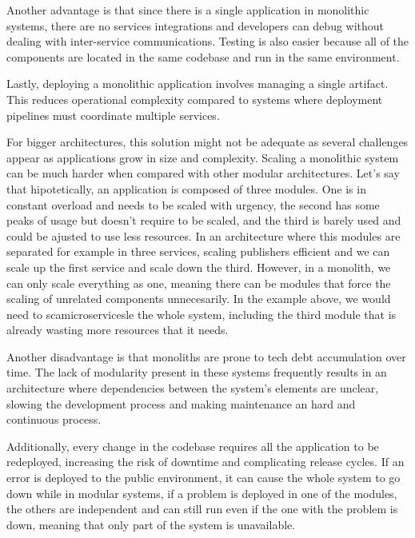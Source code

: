 Another advantage is that since there is a single application in monolithic
systems, there are no services integrations and developers can debug without
dealing with inter-service communications. Testing is also easier because all
of the components are located in the same codebase and run in the same
environment\cite{newman2019monolith}.

Lastly, deploying a monolithic application involves managing a single artifact. This
reduces operational complexity compared to systems where deployment
pipelines must coordinate multiple services\cite{AWSMonolithMicroservices}.

For bigger architectures, this solution might not be adequate as several
challenges appear as applications grow in size and complexity.
Scaling a monolithic system can be much harder when
compared with other modular architectures. Let's say that hipotetically,
an application is composed of three modules. One is in constant
overload and needs to be scaled with urgency, the second has some peaks of
usage but doesn't require to be scaled, and the third is barely used and
could be ajusted to use less resources. In an architecture where this
modules are separated for example in three services, scaling publishers
efficient and we can scale up the first service and scale down the third.
However, in a monolith, we can only scale everything as one, meaning there
can be modules that force the scaling of unrelated components unnecesarily.
In the example above, we would need to scamicroservicesle the whole system, including
the third module that is already wasting more resources that it needs\cite{7333476,AWSMonolithMicroservices}.

Another disadvantage is that monoliths are prone to tech debt accumulation over
time. The lack of modularity present in these systems frequently results in
an architecture where dependencies between the system's elements are unclear,
slowing the development process and making maintenance an hard and continuous
process\cite{7333476}.

Additionally, every change in the codebase requires all the application to be
redeployed, increasing the risk of downtime and complicating release cycles. If
an error is deployed to the public environment, it can cause the whole system
to go down while in modular systems, if a problem is deployed in one of the
modules, the others are independent and can still run even if the one with
the problem is down, meaning that only part of the system is unavailable\cite{7333476,AWSMonolithMicroservices}.

